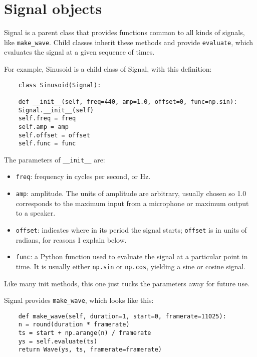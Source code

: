 \section{Signal objects}
\label{sigobs}

Signal is a parent class that provides functions common to all
kinds of signals, like \verb"make_wave".  Child classes inherit
these methods and provide {\tt evaluate}, which evaluates the
signal at a given sequence of times.

For example, Sinusoid is a child class of Signal, with this
definition:

\begin{verbatim}
	class Sinusoid(Signal):
	
	def __init__(self, freq=440, amp=1.0, offset=0, func=np.sin):
	Signal.__init__(self)
	self.freq = freq
	self.amp = amp
	self.offset = offset
	self.func = func
\end{verbatim}

The parameters of \verb"__init__" are:

\begin{itemize}
	
	\item {\tt freq}: frequency in cycles per second, or Hz.
	
	\item {\tt amp}: amplitude.  The units of amplitude are arbitrary,
	usually chosen so 1.0 corresponds to the maximum input from a
	microphone or maximum output to a speaker.
	
	\item {\tt offset}: indicates where in its period the signal starts;
	{\tt offset} is in units of radians, for reasons I explain below.
	
	\item {\tt func}: a Python function used
	to evaluate the signal at a particular point in time.  It is
	usually either {\tt np.sin} or {\tt np.cos}, yielding a sine or
	cosine signal.
	
\end{itemize}

Like many init methods, this one just tucks the parameters away for
future use.

Signal provides \verb"make_wave", which looks like
this:

\begin{verbatim}
	def make_wave(self, duration=1, start=0, framerate=11025):
	n = round(duration * framerate)
	ts = start + np.arange(n) / framerate
	ys = self.evaluate(ts)
	return Wave(ys, ts, framerate=framerate)
\end{verbatim}

